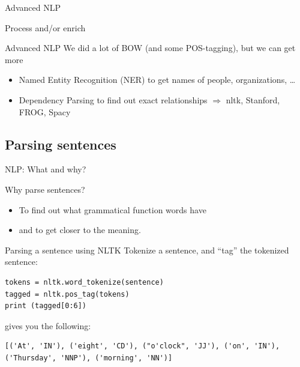 \documentclass[compress]{beamer}
\begin{document}
\begin{section}{Advanced NLP}
	
	\begin{frame}{Process and/or enrich}
	\begin{block}{Advanced NLP}
		We did a lot of BOW (and some POS-tagging), but we can get more
		\begin{itemize}
			\item Named Entity Recognition (NER) to get names of people, organizations, \ldots
			\item Dependency Parsing to find out exact relationships
			$\Rightarrow$ nltk, Stanford, FROG, Spacy
		\end{itemize}
	\end{block}
\end{frame}


%


\subsection{Parsing sentences}
\begin{frame}{NLP: What and why?}
\begin{block}{Why parse sentences?}
\begin{itemize}
	\item To find out what grammatical function words have
	\item and to get closer to the meaning.
\end{itemize}
\end{block}
\end{frame}



\begin{frame}[fragile]{Parsing a sentence using NLTK}
Tokenize a sentence, and ``tag'' the tokenized sentence:
\begin{lstlisting}
tokens = nltk.word_tokenize(sentence)
tagged = nltk.pos_tag(tokens)
print (tagged[0:6])
\end{lstlisting}
gives you the following:
\begin{lstlisting}
[('At', 'IN'), ('eight', 'CD'), ("o'clock", 'JJ'), ('on', 'IN'),
('Thursday', 'NNP'), ('morning', 'NN')]
\end{lstlisting}


\end{frame}
\end{section}
\end{document}
